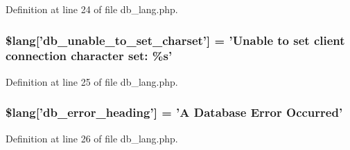 Definition at line 24 of file db\-\_\-lang.\-php.

\subsubsection[{\$lang}]{\setlength{\rightskip}{0pt plus 5cm}\$lang['db\-\_\-unable\-\_\-to\-\_\-set\-\_\-charset'] = 'Unable {\bf to} set client connection character set\-: \%{\bf s}'}\label{db__lang_8php_ab22396948e25460833329cb8786ad831}


Definition at line 25 of file db\-\_\-lang.\-php.

\subsubsection[{\$lang}]{\setlength{\rightskip}{0pt plus 5cm}\$lang['db\-\_\-error\-\_\-heading'] = 'A Database Error Occurred'}\label{db__lang_8php_a4be34cea2490b0d41689b65e52286658}


Definition at line 26 of file db\-\_\-lang.\-php.

